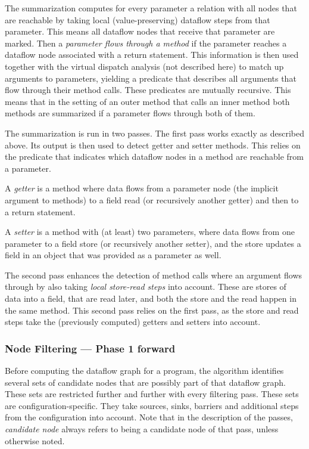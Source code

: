 The summarization computes for every parameter a relation with all nodes 
that are reachable by taking local (value-preserving) dataflow steps from that parameter.
This means all dataflow nodes that receive that parameter are marked.
Then a \emph{parameter flows through a method} if the parameter reaches a 
dataflow node associated with a return statement.
This information is then used together with the virtual dispatch analysis
(not described here) to match up arguments to parameters, yielding a predicate 
that describes all arguments that flow through their method calls.
These predicates are mutually recursive.
This means that in the setting of an outer method that calls an inner 
method both methods are summarized if a parameter flows through both of them.

The summarization is run in two passes.
The first pass works exactly as described above.
Its output is then used to detect getter and setter methods.
This relies on the predicate that indicates which dataflow nodes in a method are
reachable from a parameter.

A \emph{getter} is a method where data flows from a parameter node 
(the implicit  argument to methods) to a field read (or recursively another getter)
and then to a return statement.

A \emph{setter} is a method with (at least) two parameters,
where data flows from one parameter to a field store (or recursively another setter),
and the store updates a field in an object that was provided as a parameter as well.

The second pass enhances the detection of method calls where an argument flows through 
by also taking \emph{local store-read steps} into account.
These are stores of data into a field, that are read later, and both 
the store and the read happen in the same method.
This second pass relies on the first pass, as the store and read steps take the 
(previously computed) getters and setters into account.

\subsubsection*{Node Filtering --- Phase 1 forward}
Before computing the dataflow graph for a program,
the algorithm identifies several sets of candidate nodes that are possibly part of 
that dataflow graph.
These sets are restricted further and further with every filtering pass.
These sets are configuration-specific.
They take sources, sinks, barriers and additional steps from the configuration into 
account.
Note that in the description of the passes, \emph{candidate node} always refers
to being a candidate node of that pass, unless otherwise noted.


